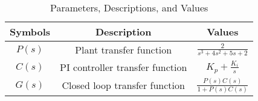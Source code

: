 \begin{table}[ht!]
\centering
\begin{tabular}{ |c|c|c| } 
 \hline
Symbols & Description & Values  \\
\hline
$P(s)$ & Plant transfer function & $\frac{2}{s^3+4s^2+5s+2}$ \\
 \hline
 $C(s)$ & PI controller transfer function &$K_p+\frac{K_i}{s}$\\
 \hline
$G(s)$ & Closed loop transfer function &$\frac{P(s)C(s)}{1+P(s)C(s)}$\\
 \hline
\end{tabular}
\caption{Parameters, Descriptions, and Values}
\label{table:ee25-ec48-gate2021}
\end{table}



